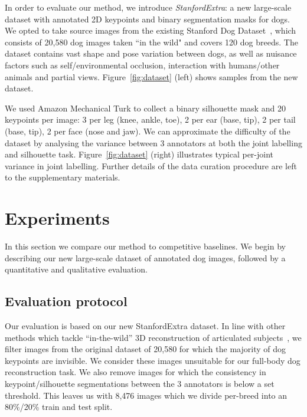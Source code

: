 In order to evaluate our method, we introduce \emph{StanfordExtra}: a new large-scale dataset with annotated 2D keypoints and binary segmentation masks for dogs. We opted to take source images from the existing Stanford Dog Dataset~\cite{StanfordDogs}, which consists of 20,580 dog images taken ``in the wild" and covers 120 dog breeds. The dataset contains vast shape and pose variation between dogs, as well as nuisance factors such as self/environmental occlusion, interaction with humans/other animals and partial views. Figure~\ref{fig:dataset} (left) shows samples from the new dataset.

We used Amazon Mechanical Turk to collect a binary silhouette mask and 20 keypoints per image: 3 per leg (knee, ankle, toe), 2 per ear (base, tip), 2 per tail (base, tip), 2 per face (nose and jaw). We can approximate the difficulty of the dataset by analysing the variance between 3 annotators at both the joint labelling and silhouette task. Figure~\ref{fig:dataset} (right) illustrates typical per-joint variance in joint labelling. Further details of the data curation procedure are left to the supplementary materials. 


\section{Experiments}



In this section we compare our method to competitive baselines. We begin by describing our new large-scale dataset of annotated dog images, followed by a quantitative and qualitative evaluation.

\subsection{Evaluation protocol}

Our evaluation is based on our new StanfordExtra dataset. In line with other methods which tackle ``in-the-wild'' 3D reconstruction of articulated subjects~\cite{kolotouros19learning,kolotouros19convolutional}, we filter images from the original dataset of 20,580 for which the majority of dog keypoints are invisible. We consider these images unsuitable for our full-body dog reconstruction task. We also remove images for which the consistency in keypoint/silhouette segmentations between the 3 annotators is below a set threshold. This leaves us with 8,476 images which we divide per-breed into an 80\%/20\% train and test split.

